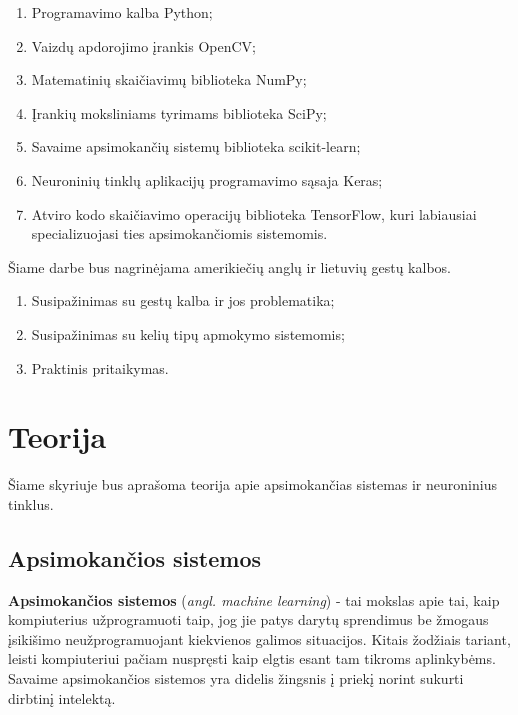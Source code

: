 \documentclass{VUMIFInfKursinis}
\begin{document}
\begin{enumerate}
	\item Programavimo kalba Python;
	\item Vaizdų apdorojimo įrankis OpenCV;
	\item Matematinių skaičiavimų biblioteka NumPy;
	\item Įrankių moksliniams tyrimams biblioteka SciPy;
	\item Savaime apsimokančių sistemų biblioteka scikit-learn;
	\item Neuroninių tinklų aplikacijų programavimo sąsaja Keras;
	\item Atviro kodo skaičiavimo operacijų biblioteka TensorFlow, kuri labiausiai specializuojasi ties apsimokančiomis sistemomis.
\end{enumerate}

Šiame darbe bus nagrinėjama amerikiečių anglų ir lietuvių gestų kalbos.
\begin{enumerate}
	\item Susipažinimas su gestų kalba ir jos problematika;
	\item Susipažinimas su kelių tipų apmokymo sistemomis;
	\item Praktinis pritaikymas.
\end{enumerate}


\section{Teorija}
Šiame skyriuje bus aprašoma teorija apie apsimokančias sistemas ir neuroninius tinklus.

\subsection{Apsimokančios sistemos}

\textbf{Apsimokančios sistemos} (\textit{angl. machine learning}) - tai mokslas apie tai, kaip kompiuterius užprogramuoti taip, jog jie patys darytų sprendimus be žmogaus įsikišimo neužprogramuojant kiekvienos galimos situacijos. Kitais žodžiais tariant, leisti kompiuteriui pačiam nuspręsti kaip elgtis esant tam tikroms aplinkybėms. Savaime apsimokančios sistemos yra didelis žingsnis į priekį norint sukurti dirbtinį intelektą.
\end{document}
